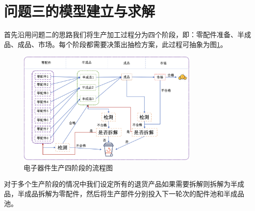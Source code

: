 \documentclass[withoutpreface,bwprint]{cumcmthesis} %
\begin{document}
\section{问题三的模型建立与求解}
首先沿用问题二的思路我们将生产加工过程分为四个阶段，即：零配件准备、半成品、成品、市场。每个阶段都需要决策出抽检方案，此过程可抽象为图\ref{fig:pro3-1}。
\begin{figure}[H]
	\centering
	\includegraphics[width=0.8\textwidth]{Fig/pro3-1.png}      
	\caption{电子器件生产四阶段的流程图}
	\label{fig:pro3-1}
\end{figure}
对于多个生产阶段的情况中我们设定所有的退货产品如果需要拆解则拆解为半成品，半成品拆解为零配件，然后将生产部件分别投入下一轮次的配件池和半成品池。
\end{document}
